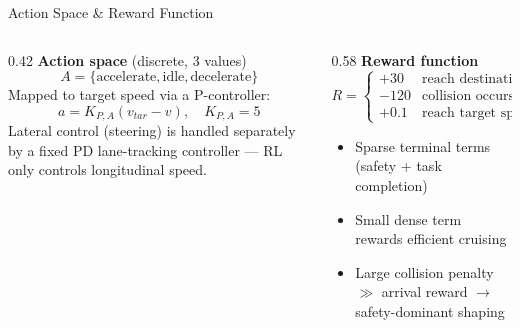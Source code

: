 \documentclass[aspectratio=169,10pt]{beamer}
\begin{document}
\begin{frame}{Action Space \& Reward Function}
    \begin{columns}[T]
        \begin{column}{0.42\textwidth}
            \textbf{Action space} (discrete, 3 values)
            \[
                A = \{\text{accelerate}, \text{idle}, \text{decelerate}\}
            \]
            Mapped to target speed via a P-controller:
            \[
                a = K_{P,A}(v_{tar} - v), \quad K_{P,A}=5
            \]
            Lateral control (steering) is handled separately by a fixed PD lane-tracking controller --- \alert{RL only controls longitudinal speed}.
        \end{column}
        \begin{column}{0.58\textwidth}
            \textbf{Reward function}
            \[
                R = \begin{cases}
                    +30 & \text{reach destination} \\
                    -120 & \text{collision occurs} \\
                    +0.1 & \text{reach target speed}
                \end{cases}
            \]
            \begin{itemize}
                \item Sparse terminal terms (safety + task completion)
                \item Small dense term rewards efficient cruising
                \item Large collision penalty $\gg$ arrival reward $\to$ safety-dominant shaping
            \end{itemize}
        \end{column}
    \end{columns}
\end{frame}
\end{document}
